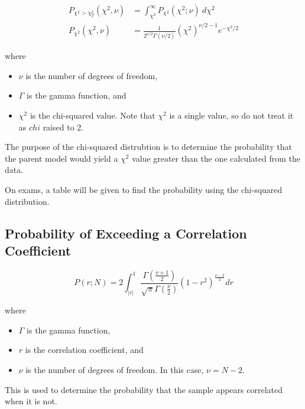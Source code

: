 \begin{align*}
    P_{\chi^2 > \chi^2_T}(\chi^2, \nu) & = \int_{\chi^2}^{\infty} P_{\chi^2}(\chi^2; \nu) ~ d\chi^2            \\
    P_{\chi^2}(\chi^2, \nu)            & = \frac{1}{2^{\nu/2}\Gamma(\nu/2)} (\chi^2)^{\nu/2 - 1} e^{-\chi^2/2}
\end{align*}

where
\begin{itemize}
    \item $\nu$ is the number of degrees of freedom,
    \item $\Gamma$ is the gamma function, and
    \item $\chi^2$ is the chi-squared value. Note that $\chi^2$ is a single value, so do not treat it as $chi$ raised to 2.

\end{itemize}

The purpose of the chi-squared distrubtion is to determine the probability that the parent model would yield a $\chi^2$ value greater than the one calculated from the data.

\vsp

On exams, a table will be given to find the probability using the chi-squared distribution.

\subsection{Probability of Exceeding a Correlation Coefficient}

\begin{equation*}
    P(r; N) = 2 \int_{|r|}^{1} \frac{\Gamma(\frac{\nu + 1}{2})}{\sqrt{\pi}\Gamma(\frac{\nu}{2})} (1-r^2)^{\frac{\nu - 2}{2}} dr
\end{equation*}

where

\begin{itemize}
    \item $\Gamma$ is the gamma function,
    \item $r$ is the correlation coefficient, and
    \item $\nu$ is the number of degrees of freedom. In this case, $\nu = N - 2$.
\end{itemize}

This is used to determine the probability that the sample appears correlated when it is not.